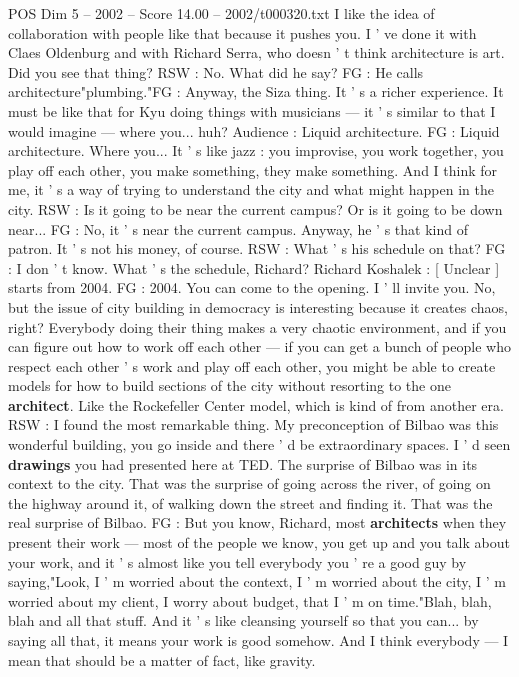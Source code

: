\begin{textsample}{POS Dim 5 – 2002 – Score 14.00 – 2002/t000320.txt}
I like the idea of collaboration with people like that because it pushes you.
I ' ve done it with Claes Oldenburg and with Richard Serra, who doesn ' t think architecture is art.
Did you see that thing?
RSW : No.
What did he say?
FG : He calls architecture"plumbing."FG : Anyway, the Siza thing.
It ' s a richer experience.
It must be like that for Kyu doing things with musicians — it ' s similar to that I would imagine — where you... huh?
Audience : Liquid architecture.
FG : Liquid architecture.
Where you...
It ' s like jazz : you improvise, you work together, you play off each other, you make something, they make something.
And I think for me, it ' s a way of trying to understand the city and what might happen in the city.
RSW : Is it going to be near the current campus?
Or is it going to be down near...
FG : No, it ' s near the current campus.
Anyway, he ' s that kind of patron.
It ' s not his money, of course.
RSW : What ' s his schedule on that?
FG : I don ' t know.
What ' s the schedule, Richard?
Richard Koshalek : [ Unclear ] starts from 2004.
FG : 2004.
You can come to the opening.
I ' ll invite you.
No, but the issue of city building in democracy is interesting because it creates chaos, right?
Everybody doing their thing makes a very chaotic environment, and if you can figure out how to work off each other — if you can get a bunch of people who respect each other ' s work and play off each other, you might be able to create models for how to build sections of the city without resorting to the one \textbf{architect}.
Like the Rockefeller Center model, which is kind of from another era.
RSW : I found the most remarkable thing.
My preconception of Bilbao was this wonderful building, you go inside and there ' d be extraordinary spaces.
I ' d seen \textbf{drawings} you had presented here at TED.
The surprise of Bilbao was in its context to the city.
That was the surprise of going across the river, of going on the highway around it, of walking down the street and finding it.
That was the real surprise of Bilbao.
FG : But you know, Richard, most \textbf{architects} when they present their work — most of the people we know, you get up and you talk about your work, and it ' s almost like you tell everybody you ' re a good guy by saying,"Look, I ' m worried about the context, I ' m worried about the city, I ' m worried about my client, I worry about budget, that I ' m on time."Blah, blah, blah and all that stuff.
And it ' s like cleansing yourself so that you can... by saying all that, it means your work is good somehow.
And I think everybody — I mean that should be a matter of fact, like gravity.

\end{textsample}
